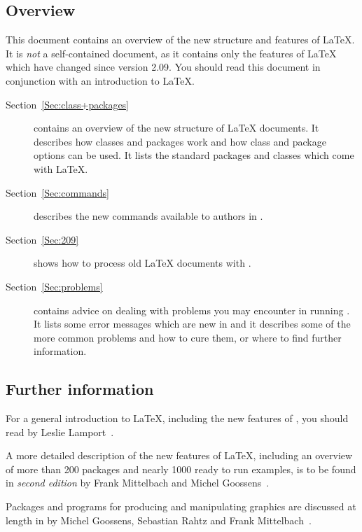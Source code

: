 \documentclass{ltxguide}[2001/05/28]
\begin{document}
\subsection{Overview}

This document contains an overview of the new structure and features
of \LaTeX.  It is \emph{not} a self-contained document, as it contains
only the features of \LaTeX{} which have changed since version 2.09.
You should read this document in conjunction with an introduction to
\LaTeX{}.

\begin{description}

\item[Section~\ref{Sec:class+packages}]
   contains an overview of the new structure of
   \LaTeX{} documents.  It describes how classes and packages work and
   how class and package options can be used.  It lists the standard
   packages and classes which come with \LaTeX.

\item[Section~\ref{Sec:commands}] describes the new commands available
   to authors in \LaTeXe.

\item[Section~\ref{Sec:209}] shows how to process old \LaTeX{}
   documents with \LaTeXe.

\item[Section~\ref{Sec:problems}] contains advice on dealing with
   problems you may encounter in running \LaTeXe.
   It lists some error messages which are new in \LaTeXe{} and
   it describes some of the more common problems and how to cure them,
   or where to find further information.

\end{description}

\subsection{Further information}

For a general introduction to \LaTeX, including the new features of
\LaTeXe, you should read \emph{\LaTeXbook}
by Leslie Lamport~\cite{A-W:LLa94}.

A more detailed description of the new features of \LaTeX, including an
overview of more than 200 packages and nearly 1000 ready to run examples, is
to be found in \emph{\LaTeXcomp second edition} by Frank Mittelbach and
Michel Goossens~\cite{A-W:MG2004}.

Packages and programs for producing and manipulating graphics are
discussed at length in \emph{\LaTeXGcomp} by Michel Goossens,
Sebastian Rahtz and Frank Mittelbach~\cite{A-W:GRM97}.
\end{document}
